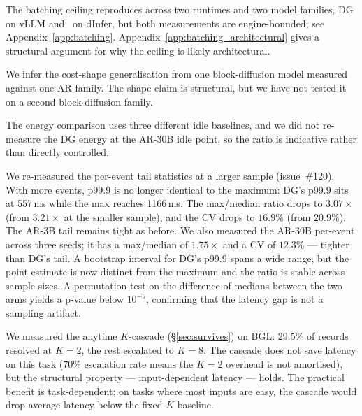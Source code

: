 The batching ceiling reproduces across two runtimes and two model
families, DG on vLLM and \LLaDA\ on dInfer, but both measurements
are engine-bounded; see
Appendix~\ref{app:batching}. Appendix~\ref{app:batching_architectural}
gives a structural argument for why the ceiling is likely
architectural.

We infer the cost-shape generalisation from one block-diffusion
model measured against one AR family. The shape claim is structural,
but we have not tested it on a second block-diffusion family.

The energy comparison uses three different idle baselines, and we
did not re-measure the DG energy at the AR-30B idle point, so the
ratio is indicative rather than directly controlled.

We re-measured the per-event tail statistics at a larger sample
(issue~\#120). With more events, p99.9 is no longer identical to the
maximum: DG's p99.9 sits at 557\,ms while the max reaches 1166\,ms.
The max/median ratio drops to $3.07\times$ (from $3.21\times$ at the
smaller sample), and the CV drops to $16.9\%$ (from $20.9\%$). The
AR-3B tail remains tight as before. We also measured the AR-30B
per-event across three seeds; it has a max/median of $1.75\times$ and
a CV of $12.3\%$ --- tighter than DG's tail. A bootstrap interval
for DG's p99.9 spans a wide range, but the point estimate is now
distinct from the maximum and the ratio is stable across sample
sizes. A permutation test on the difference of medians between the
two arms yields a p-value below $10^{-5}$, confirming that the
latency gap is not a sampling artifact.

We measured the anytime $K$-cascade (\S\ref{sec:survives}) on BGL:
29.5\% of records resolved at $K{=}2$, the rest escalated to $K{=}8$.
The cascade does not save latency on this task (70\% escalation rate
means the $K{=}2$ overhead is not amortised), but the structural
property --- input-dependent latency --- holds. The practical
benefit is task-dependent: on tasks where most inputs are easy, the
cascade would drop average latency below the fixed-$K$ baseline.

